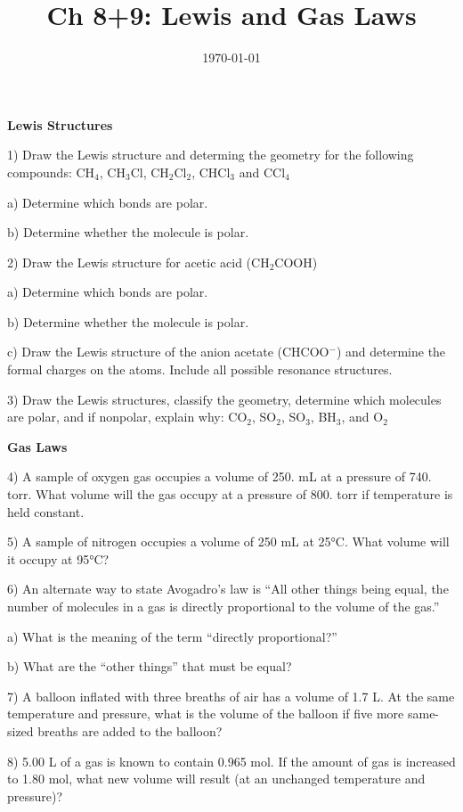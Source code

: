 \documentclass[12pt]{article}
\title{\textbf{Ch 8+9: Lewis and Gas Laws}}
\date{\today}
\begin{document}
\maketitle 

\textbf{Lewis Structures}

1) Draw the Lewis structure and determing the geometry for the following
compounds: CH$_4$, CH$_3$Cl, CH$_2$Cl$_2$,  CHCl$_3$ and CCl$_4$

a) Determine which bonds are polar.

b) Determine whether the molecule is polar.

\vspace{0.5in}

2) Draw the Lewis structure for acetic acid (CH$_2$COOH)

a) Determine which bonds are polar.

b) Determine whether the molecule is polar.

c) Draw the Lewis structure of the anion acetate (CHCOO$^-$)
and determine the formal charges on the atoms. Include all possible
resonance structures.

\vspace{0.5in}

3) Draw the Lewis structures, classify the geometry, determine which molecules
are polar, and if nonpolar, explain why: CO$_2$, SO$_2$, SO$_3$, BH$_3$, and O$_2$

\vspace{0.5in}

\textbf{Gas Laws}

4) A sample of oxygen gas occupies a volume of 250. mL at a pressure of
740. torr. What volume will the gas occupy at a pressure of 800. torr if
temperature is held constant.

\vspace{0.5in}

5) A sample of nitrogen occupies a volume of 250 mL at 25°C. What volume will
it occupy at 95°C?

\vspace{0.5in}

6) An alternate way to state Avogadro’s law is “All other things being equal,
the number of molecules in a gas is directly proportional to the volume of the gas.”

a) What is the meaning of the term “directly proportional?”

b) What are the “other things” that must be equal?

\vspace{0.5in}

7) A balloon inflated with three breaths of air has a volume of 1.7 L. At the
same temperature and pressure, what is the volume of the balloon if five more
same-sized breaths are added to the balloon?

\vspace{0.5in}

8) 5.00 L of a gas is known to contain 0.965 mol. If the amount of gas is increased
to 1.80 mol, what new volume will result (at an unchanged temperature and pressure)? 
\end{document}
